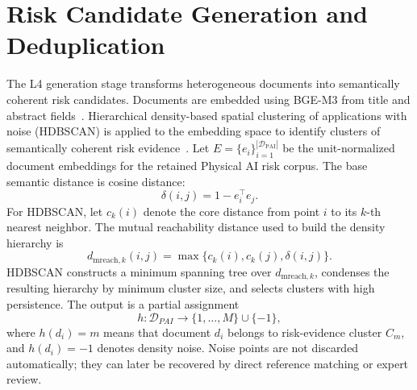 \documentclass[11pt]{article}
\newcommand{\DPAI}{\mathcal{D}_{\mathrm{PAI}}}
\begin{document}
\section{Risk Candidate Generation and Deduplication}

The L4 generation stage transforms heterogeneous documents into semantically coherent risk candidates. Documents are embedded using BGE-M3 from title and abstract fields~\cite{chen2024bgem3}. Hierarchical density-based spatial clustering of applications with noise (HDBSCAN) is applied to the embedding space to identify clusters of semantically coherent risk evidence~\cite{campello2013,hdbscan2017}. Let \(E=\{e_i\}_{i=1}^{|\DPAI|}\) be the unit-normalized document embeddings for the retained Physical AI risk corpus. The base semantic distance is cosine distance:
\begin{equation}
  \delta(i,j)=1-e_i^{\top}e_j.
\end{equation}
For HDBSCAN, let \(c_k(i)\) denote the core distance from point \(i\) to its \(k\)-th nearest neighbor. The mutual reachability distance used to build the density hierarchy is
\begin{equation}
  d_{\mathrm{mreach},k}(i,j)=
  \max\{c_k(i),c_k(j),\delta(i,j)\}.
\end{equation}
HDBSCAN constructs a minimum spanning tree over \(d_{\mathrm{mreach},k}\), condenses the resulting hierarchy by minimum cluster size, and selects clusters with high persistence. The output is a partial assignment
\begin{equation}
  h:\mathcal{D}_{PAI}\rightarrow\{1,\ldots,M\}\cup\{-1\},
\end{equation}
where \(h(d_i)=m\) means that document \(d_i\) belongs to risk-evidence cluster \(C_m\), and \(h(d_i)=-1\) denotes density noise. Noise points are not discarded automatically; they can later be recovered by direct reference matching or expert review.
\end{document}
